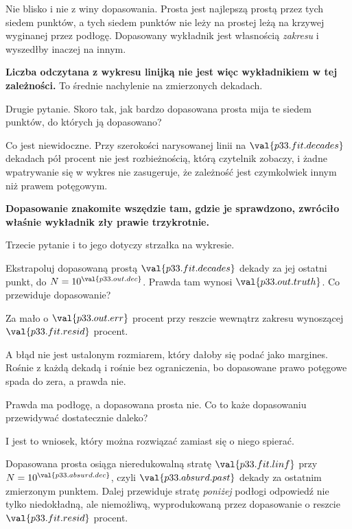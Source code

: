 \begin{fr}
Nie blisko i nie z winy dopasowania. Prosta jest najlepszą prostą przez tych
siedem punktów, a tych siedem punktów nie leży na prostej \dash{} leżą na
krzywej wyginanej przez podłogę. Dopasowany wykładnik jest własnością
\emph{zakresu} i wyszedłby inaczej na innym.

\textbf{Liczba odczytana z wykresu linijką nie jest więc wykładnikiem w tej
zależności.} To średnie nachylenie na zmierzonych dekadach.
\end{fr}

\begin{fr}
Drugie pytanie. Skoro tak, jak bardzo dopasowana prosta mija te siedem
punktów, do których ją dopasowano?
\dotline
\nextframe
\end{fr}

\begin{fr}
Co jest niewidoczne. Przy szerokości narysowanej linii na
$\val{p33.fit.decades}$ dekadach pół procent nie jest rozbieżnością, którą
czytelnik zobaczy, i żadne wpatrywanie się w wykres nie zasugeruje, że
zależność jest czymkolwiek innym niż prawem potęgowym.

\textbf{Dopasowanie znakomite wszędzie tam, gdzie je sprawdzono, zwróciło
właśnie wykładnik zły prawie trzykrotnie.}
\end{fr}

\begin{fr}
Trzecie pytanie i to jego dotyczy strzałka na wykresie.

Ekstrapoluj dopasowaną prostą $\val{p33.fit.decades}$ dekady za jej ostatni
punkt, do $N = 10^{\val{p33.out.dec}}$. Prawda tam wynosi
$\val{p33.out.truth}$. Co przewiduje dopasowanie?
\dotline
\nextframe
\end{fr}

\begin{fr}
Za mało o $\val{p33.out.err}$ procent \dash{} przy reszcie wewnątrz zakresu
wynoszącej $\val{p33.fit.resid}$ procent.

A błąd nie jest ustalonym rozmiarem, który dałoby się podać jako margines.
Rośnie z każdą dekadą i rośnie bez ograniczenia, bo dopasowane prawo potęgowe
spada do zera, a prawda nie.

Prawda ma podłogę, a dopasowana prosta nie. Co to każe dopasowaniu przewidywać
dostatecznie daleko?
\dotline
\nextframe
\end{fr}

\begin{fr}
I jest to wniosek, który można rozwiązać zamiast się o niego spierać.

Dopasowana prosta osiąga nieredukowalną stratę $\val{p33.fit.linf}$ przy
$N = 10^{\val{p33.absurd.dec}}$, czyli $\val{p33.absurd.past}$ dekady za
ostatnim zmierzonym punktem. Dalej przewiduje stratę \emph{poniżej} podłogi
\dash{} odpowiedź nie tylko niedokładną, ale niemożliwą, wyprodukowaną przez
dopasowanie o reszcie $\val{p33.fit.resid}$ procent.
\end{fr}

